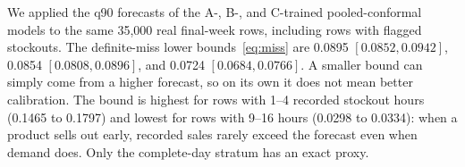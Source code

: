 We applied the q90 forecasts of the A-, B-, and C-trained pooled-conformal models to the same 35,000 real final-week rows, including rows with flagged stockouts. The definite-miss lower bounds~\eqref{eq:miss} are 0.0895 $[0.0852, 0.0942]$, 0.0854 $[0.0808, 0.0896]$, and 0.0724 $[0.0684, 0.0766]$. A smaller bound can simply come from a higher forecast, so on its own it does not mean better calibration. The bound is highest for rows with 1--4 recorded stockout hours (0.1465 to 0.1797) and lowest for rows with 9--16 hours (0.0298 to 0.0334): when a product sells out early, recorded sales rarely exceed the forecast even when demand does. Only the complete-day stratum has an exact proxy.

